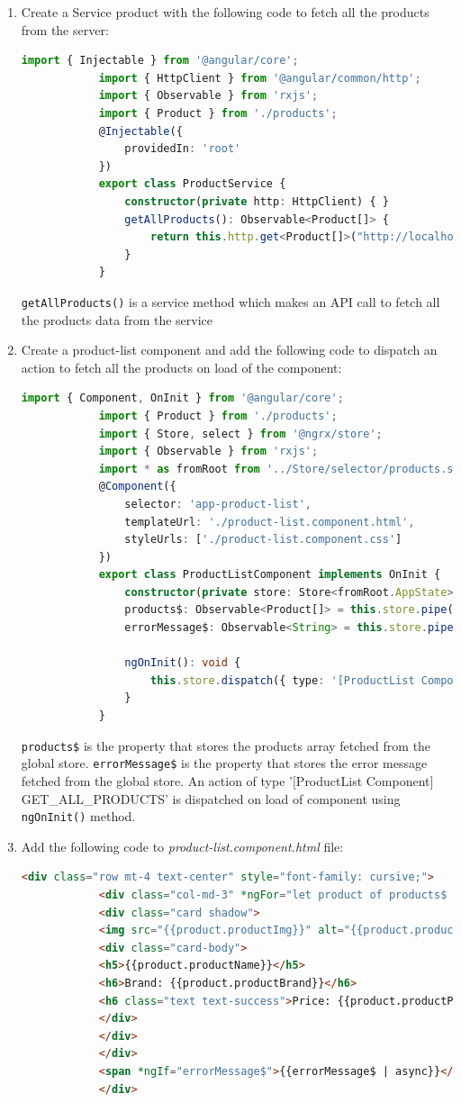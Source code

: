 \documentclass{report}
\begin{document}
\begin{enumerate}
\item{Create a Service product with the following code to fetch all the products from the server:}
		\begin{lstlisting}[language=Typescript, caption=product.service.ts]
			import { Injectable } from '@angular/core';
			import { HttpClient } from '@angular/common/http';
			import { Observable } from 'rxjs';
			import { Product } from './products';
			@Injectable({
				providedIn: 'root'
			})
			export class ProductService {
				constructor(private http: HttpClient) { }
				getAllProducts(): Observable<Product[]> {
					return this.http.get<Product[]>("http://localhost:4000/products");
				}
			}
\end{lstlisting}
\lstinline{getAllProducts()} is a service method which makes an API call to fetch all the products data from the service

\item{Create a product-list component and add the following code to dispatch an action to fetch all the products on load of the component:}
		\begin{lstlisting}[caption=product-list.component.ts, language=Typescript]
			import { Component, OnInit } from '@angular/core';
			import { Product } from './products';
			import { Store, select } from '@ngrx/store';
			import { Observable } from 'rxjs';
			import * as fromRoot from '../Store/selector/products.selector';
			@Component({
				selector: 'app-product-list',
				templateUrl: './product-list.component.html',
				styleUrls: ['./product-list.component.css']
			})
			export class ProductListComponent implements OnInit {
				constructor(private store: Store<fromRoot.AppState>) { }
				products$: Observable<Product[]> = this.store.pipe(select(fromRoot.selectFeatureProduct))
				errorMessage$: Observable<String> = this.store.pipe(select(fromRoot.selectFeatureError))

				ngOnInit(): void {
					this.store.dispatch({ type: '[ProductList Component] GET_ALL_PRODUCTS' });
				}
			}
\end{lstlisting}
\lstinline{products$} is the property that stores the products array fetched from the global store. \lstinline{errorMessage$} is the property that stores the error message fetched from the global store. An action of type '[ProductList Component] GET\_ALL\_PRODUCTS' is dispatched on load of component using \lstinline{ngOnInit()} method.

\item{Add the following code to \textit{product-list.component.html} file:}
		\begin{lstlisting}[language=HTML, caption=product-list.component.html]
			<div class="row mt-4 text-center" style="font-family: cursive;">
			<div class="col-md-3" *ngFor="let product of products$ | async; let i = index">
			<div class="card shadow">
			<img src="{{product.productImg}}" alt="{{product.productName}}">
			<div class="card-body">
			<h5>{{product.productName}}</h5>
			<h6>Brand: {{product.productBrand}}</h6>
			<h6 class="text text-success">Price: {{product.productPrice | currency:'INR'}}</h6>
			</div>
			</div>
			</div>
			<span *ngIf="errorMessage$">{{errorMessage$ | async}}</span>
			</div>


\end{lstlisting}
\end{enumerate}
\end{document}
